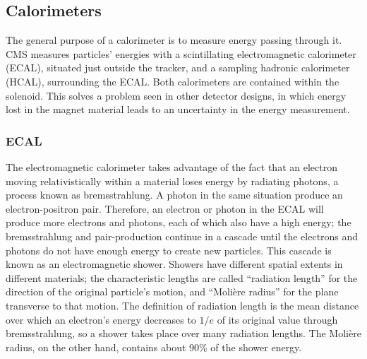 \subsection{Calorimeters}
\label{exp:cal}
The general purpose of a calorimeter 
is to measure energy passing through it.  
CMS measures %
particles' energies 
with a scintillating electromagnetic calorimeter (ECAL),
situated just outside the tracker,
and a sampling hadronic calorimeter (HCAL),
surrounding the ECAL.  
Both calorimeters are contained within the solenoid.  
This solves a problem seen in other detector designs, 
in which energy lost in the magnet material leads 
to an uncertainty in the energy measurement.  

\subsubsection{ECAL}
\label{exp:ECAL}
The electromagnetic calorimeter takes advantage 
of the fact that an electron moving 
relativistically within a 
material 
loses energy by radiating photons, a process 
known as bremsstrahlung.  
A photon in the same situation produce an electron-positron pair.  
Therefore, an electron or photon in the ECAL 
will produce more electrons and photons, 
each of which also have a high energy; 
the bremsstrahlung and pair-production continue 
in a cascade 
until the electrons and photons do not have enough 
energy to create new particles.  
This cascade is known as an electromagnetic shower.  
Showers have different spatial extents in different materials; 
the characteristic lengths are called ``radiation length'' 
for the direction of the original particle's motion, 
and ``Moli\`ere radius'' for the plane transverse 
to that motion.  
The definition of radiation length is the mean distance 
over which an electron's energy decreases to $1/e$ 
of its original value through bremsstrahlung, 
so a shower takes place over many radiation lengths. 
The Moli\`ere radius, on the other hand,  
contains about 90\% of the shower energy.  

